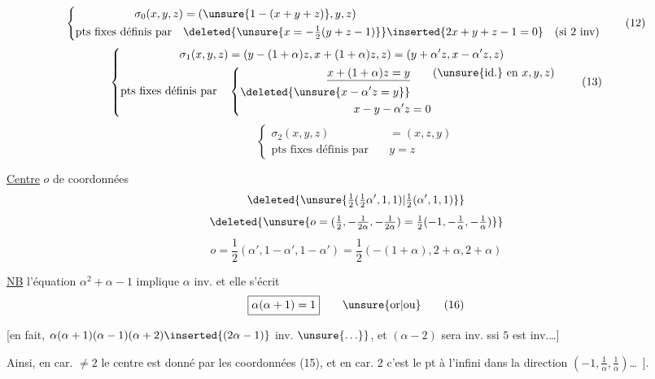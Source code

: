 \[
\left\{\begin{aligned}
\sigma_0(x,y,z)&=(\unsure{1-(x+y+z)},y,z)\\
\text{pts fixes définis par}\quad&\deleted{\unsure{x=-\tfrac12(y+z-1)}}\inserted{2x+y+z-1=0}\quad\text{(si }2\text{ inv)}
\end{aligned}\right.\tag*{(12)}
\]
\[
\left\{\begin{aligned}
\sigma_1(x,y,z)&=(y-(1+\alpha)z,x+(1+\alpha)z,z)=(y+\alpha'z,x-\alpha'z,z)\\
\text{pts fixes définis par}\quad&\left\{\begin{aligned}
\underline{x+(1+\alpha)z=y}&\qquad\text{(\unsure{id.} en }x,y,z\text{)}\\
\deleted{\unsure{x-\alpha'z=y}}&\\
x-y-\alpha'z&=0
\end{aligned}\right.
\end{aligned}\right.\tag*{(13)}
\]
\[
\left\{\begin{aligned}\sigma_2(x,y,z)&=(x,z,y)\\\text{pts fixes définis par}\quad&y=z\end{aligned}\right.\tag*{(14)}
\]

\uline{Centre} $o$ de coordonnées
\[
\deleted{\unsure{\tfrac12(\tfrac12\alpha',1,1)|\tfrac12(\alpha',1,1)}}
\]
\[
\deleted{\unsure{o=(\tfrac12,-\tfrac1{2\alpha},-\tfrac1{2\alpha})=\tfrac12(-1,-\tfrac1\alpha,-\tfrac1\alpha)}}
\]
\[
o=\frac12(\alpha',1-\alpha',1-\alpha')=\frac12(-(1+\alpha),2+\alpha,2+\alpha)\tag*{(15)}
\]

\uline{NB} l'équation $\alpha^2+\alpha-1$ implique $\alpha$ inv. et  elle s'écrit
\[
\boxed{\alpha(\alpha+1)=1}\qquad\unsure{\text{or}|\text{ou}}\tag*{(16)}
\]

[en fait, $\alpha(\alpha+1)(\alpha-1)(\alpha+2)\inserted{(2\alpha-1)}$  inv. $\unsure{\ldots\}}$, et $(\alpha-2)$ sera inv. ssi $5$ est inv.\dots]

Ainsi, en car. $\ne2$ le centre est donné par les coordonnées (15), et en car. $2$ c'est  le pt à l'infini dans la direction $(-1,\frac1\alpha,\frac1\alpha)$\dots\ ].
